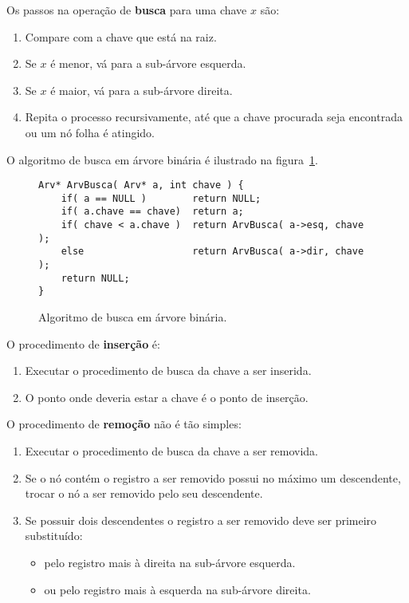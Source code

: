Os passos na operação de {\bf busca} para uma chave $x$ são:
\begin{enumerate}
\item Compare com a chave que está na raiz.
\item Se $x$ é menor, vá para a sub-árvore esquerda.
\item Se $x$ é maior, vá para a sub-árvore direita.
\item Repita o processo recursivamente, até que a chave procurada seja
encontrada ou um nó folha é atingido.
\end{enumerate}
O algoritmo de busca em árvore binária é ilustrado na figura~\ref{aula05:algo:arv:busca}.
\begin{figure}[!htb]
\centering
\begin{framed}
\begin{lstlisting}
Arv* ArvBusca( Arv* a, int chave ) {
	if( a == NULL )        return NULL;
	if( a.chave == chave)  return a;
	if( chave < a.chave )  return ArvBusca( a->esq, chave );
	else                   return ArvBusca( a->dir, chave );
	return NULL;
}
\end{lstlisting}
\end{framed}
\caption{Algoritmo de busca em árvore binária.}
\label{aula05:algo:arv:busca}
\end{figure}

O procedimento de {\bf inserção} é:
\begin{enumerate}
\item Executar o procedimento de busca da chave a ser inserida.
\item O ponto onde deveria estar a chave é o ponto de inserção.
\end{enumerate}

O procedimento de {\bf remoção} não é tão simples:
\begin{enumerate}
\item Executar o procedimento de busca da chave a ser removida.
\item Se o nó contém o registro a ser removido possui no máximo
um descendente, trocar o nó a ser removido pelo seu descendente.
\item Se possuir dois descendentes o registro a ser removido deve ser primeiro
substituído:
	\begin{itemize}
	\item pelo registro mais à direita na sub-árvore esquerda.
	\item ou pelo registro mais à esquerda na sub-árvore direita.
	\end{itemize}
\end{enumerate}

